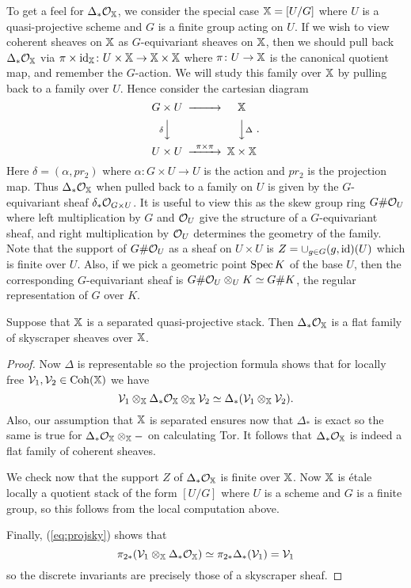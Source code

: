 \documentclass[12pt]{amsart}
\begin{document}
To get a feel for $\Delta_* \mathcal{O}_{\mathbb{X}}$, we consider the special case $\mathbb{X}= [U/G]$ where $U$ is a quasi-projective scheme and $G$ is a finite group acting on $U$. If we wish to view coherent sheaves on $\mathbb{X}$ as $G$-equivariant sheaves on $\mathbb{X}$, then we should pull back $\Delta_* \mathcal{O}_{\mathbb{X}}$ via $\pi \times \operatorname{id}_{\mathbb{X}} \colon U \times \mathbb{X} \to \mathbb{X} \times \mathbb{X}$ where $\pi \colon U \to \mathbb{X}$ is the canonical quotient map, and remember the $G$-action. We will study this family over $\mathbb{X}$ by pulling back to a family over $U$. Hence consider the cartesian diagram
$$\begin{CD}
G \times U @>>> \bX \\
@V{\delta}VV @VV{\Delta}V \\
U \times U @>{\pi \times \pi}>> \bX \times \bX 
\end{CD}.$$
Here $\delta = (\alpha, pr_2)$ where $\alpha \colon G \times U \to U$ is the action and $pr_2$ is the projection map. Thus $\Delta_*\mathcal{O}_{\mathbb{X}}$ when pulled 
back to a family on $U$ is given by the $G$-equivariant sheaf $\delta_* \mathcal{O}_{G \times U}$. It is useful to view this as the skew group ring $G \# \mathcal{O}_U$ where left multiplication by $G$ and $\mathcal{O}_U$ give the structure of a $G$-equivariant sheaf, and right multiplication by $\mathcal{O}_{U}$ determines the geometry of the family.  Note that the support of $G \# \mathcal{O}_U$ as a sheaf on $U \times U$ is $Z = \cup_{g \in G} (g,\operatorname{id})(U)$ which is finite over $U$. Also, if we pick a geometric point $\operatorname{Spec} K$ of the base $U$, then the corresponding $G$-equivariant sheaf is $G \# \mathcal{O}_U \otimes_U K \simeq G \# K$, the regular representation of $G$ over $K$. 


\begin{proposition} \label{prop:universalsky}
Suppose that $\mathbb{X}$ is a separated quasi-projective stack. Then $\Delta_* \mathcal{O}_{\mathbb{X}}$ is a flat family of skyscraper sheaves over $\mathbb{X}$. 
\end{proposition}
\begin{proof}
Now $\Delta$ is representable so the projection formula shows that for locally free $\mathcal{V}_1,\mathcal{V}_2 \in \operatorname{Coh}(\mathbb{X})$ we have
\begin{equation} \mathcal{V}_1 \otimes_{\mathbb{X}} \Delta_* \mathcal{O}_{\mathbb{X}} \otimes_{\mathbb{X}} \mathcal{V}_2 \simeq \Delta_*(\mathcal{V}_1 \otimes_{\mathbb{X}} \mathcal{V}_2) .
\label{eq:projsky}
\end{equation}
Also, our assumption that $\mathbb{X}$ is separated ensures now that $\Delta_*$ is exact so the same is true for $\Delta_* \mathcal{O}_{\mathbb{X}} \otimes_{\mathbb{X}} -$ on calculating Tor. It follows that $\Delta_* \mathcal{O}_{\mathbb{X}}$ is indeed a flat family of coherent sheaves. 

We check now that the support $Z$ of $\Delta_* \mathcal{O}_{\mathbb{X}}$ is finite over $\mathbb{X}$. Now $\mathbb{X}$ is \'etale locally  a quotient stack of the form $[U/G]$ where $U$ is a scheme and $G$ is a finite group, so this follows from the local computation above. 

Finally, (\ref{eq:projsky}) shows that 
$$ \pi_{2*} (\mathcal{V}_1 \otimes_{\mathbb{X}} \Delta_* \mathcal{O}_{\mathbb{X}})
\simeq \pi_{2*} \Delta_*(\mathcal{V}_1) = \mathcal{V}_1
$$
so the discrete invariants are precisely those of a skyscraper sheaf. 
\end{proof}
\end{document}
